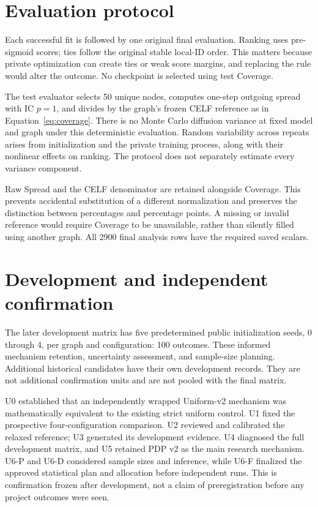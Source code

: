 \section{Evaluation protocol}
Each successful fit is followed by one original final evaluation. Ranking uses pre-sigmoid scores; ties follow the original stable local-ID order. This matters because private optimization can create ties or weak score margins, and replacing the rule would alter the outcome. No checkpoint is selected using test Coverage.

The test evaluator selects 50 unique nodes, computes one-step outgoing spread with IC $p=1$, and divides by the graph's frozen CELF reference as in Equation~\eqref{eq:coverage}. There is no Monte Carlo diffusion variance at fixed model and graph under this deterministic evaluation. Random variability across repeats arises from initialization and the private training process, along with their nonlinear effects on ranking. The protocol does not separately estimate every variance component.

Raw Spread and the CELF denominator are retained alongside Coverage. This prevents accidental substitution of a different normalization and preserves the distinction between percentages and percentage points. A missing or invalid reference would require Coverage to be unavailable, rather than silently filled using another graph. All 2900 final analysis rows have the required saved scalars.

\section{Development and independent confirmation}
The later development matrix has five predetermined public initialization seeds, 0 through 4, per graph and configuration: 100 outcomes. These informed mechanism retention, uncertainty assessment, and sample-size planning. Additional historical candidates have their own development records. They are not additional confirmation units and are not pooled with the final matrix.

U0 established that an independently wrapped Uniform-v2 mechanism was mathematically equivalent to the existing strict uniform control. U1 fixed the prospective four-configuration comparison. U2 reviewed and calibrated the relaxed reference; U3 generated its development evidence. U4 diagnosed the full development matrix, and U5 retained PDP v2 as the main research mechanism. U6-P and U6-D considered sample sizes and inference, while U6-F finalized the approved statistical plan and allocation before independent runs. This is confirmation frozen after development, not a claim of preregistration before any project outcomes were seen.


